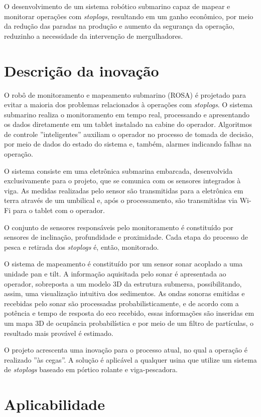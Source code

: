 O desenvolvimento de um sistema robótico submarino capaz de mapear e monitorar
operações com \textit{stoplogs}, resultando em um ganho econômico, por meio da
redução das paradas na produção e aumento da segurança da operação,
reduzinho a necessidade da intervenção de mergulhadores.

\section{Descrição da inovação}

O robô de monitoramento e mapeamento submarino (ROSA) é projetado para evitar a
maioria dos problemas relacionados à operações com \textit{stoplogs}. O sistema
submarino realiza o monitoramento em tempo real, processando e apresentando os
dados diretamente em um tablet instalado na cabine do operador. Algoritmos de
controle ''inteligentes'' auxiliam o operador no processo de tomada de decisão,
por meio de dados do estado do sistema e, também, alarmes indicando falhas na
operação.

O sistema consiste em uma eletrônica submarina embarcada, desenvolvida
exclusivamente para o projeto, que se comunica com os sensores integrados à
viga. As medidas realizadas pelo sensor são transmitidas para a
eletrônica em terra através de um umbilical e, após o processamento, são
transmitidas via Wi-Fi para o tablet com o operador.

O conjunto de sensores responsáveis pelo monitoramento é constituído por
sensores de inclinação, profundidade e proximidade. Cada etapa do processo de
pesca e retirada dos \textit{stoplogs} é, então, monitorado.

O sistema de mapeamento é constituído por um sensor sonar acoplado a uma unidade
pan e tilt. A informação aquisitada pelo sonar é apresentada ao operador,
sobreposta a um modelo 3D da estrutura submersa, possibilitando, assim, uma
visualização intuitiva dos sedimentos. As ondas sonoras emitidas e recebidas pelo sonar são
processadas probabilisticamente, e de acordo com a potência e tempo de resposta
do eco recebido, essas informações são inseridas em um mapa 3D de ocupância
probabilística e por meio de um filtro de partículas, o resultado mais provável
é estimado.

O projeto acrescenta uma inovação para o processo atual, no qual a operação é
realizado ''às cegas''. A solução é aplicável a qualquer usina que utilize um
sistema de \textit{stoplogs} baseado em pórtico rolante e viga-pescadora.


\section{Aplicabilidade}

